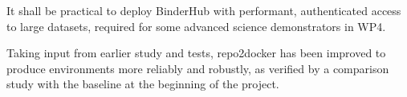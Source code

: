 \begin{milestones}
  {
  It shall be practical to deploy BinderHub with performant, authenticated access to large datasets,
  required for some advanced science demonstrators in WP4.
  }

  {
  Taking input from earlier study and tests,
  repo2docker has been improved to produce environments more reliably and robustly,
  as verified by a comparison study with the baseline at the beginning of the project.
  }

\end{milestones}

\milestonetable
